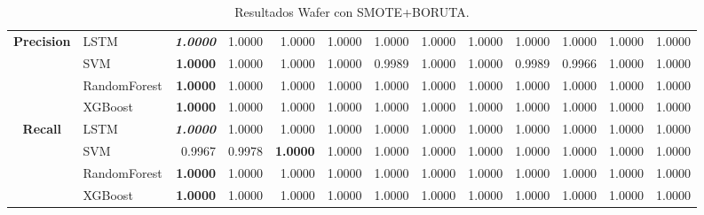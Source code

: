 \begin{table}[H]
\begin{adjustbox}{max width=12cm}
\begin{tabular}{|c|l|r|r|r|r|r|r|r|r|r|r|r|}
			\hline
			\textbf{Precision} &  LSTM & \textit{ \textbf{  1.0000 } } &  1.0000 &  1.0000 &  1.0000 &  1.0000 &  1.0000 &  1.0000 &  1.0000 &  1.0000 &  1.0000 &  1.0000 \\
			&  SVM & \textbf{  1.0000 } &  1.0000 &  1.0000 &  1.0000 &  0.9989 &  1.0000 &  1.0000 &  0.9989 &  0.9966 &  1.0000 &  1.0000 \\
			&  RandomForest & \textbf{  1.0000 } &  1.0000 &  1.0000 &  1.0000 &  1.0000 &  1.0000 &  1.0000 &  1.0000 &  1.0000 &  1.0000 &  1.0000 \\
			&  XGBoost & \textbf{  1.0000 } &  1.0000 &  1.0000 &  1.0000 &  1.0000 &  1.0000 &  1.0000 &  1.0000 &  1.0000 &  1.0000 &  1.0000 \\
			\hline
			\textbf{Recall} &  LSTM & \textit{ \textbf{  1.0000 } } &  1.0000 &  1.0000 &  1.0000 &  1.0000 &  1.0000 &  1.0000 &  1.0000 &  1.0000 &  1.0000 &  1.0000 \\
			&  SVM &  0.9967 &  0.9978 & \textbf{  1.0000 } &  1.0000 &  1.0000 &  1.0000 &  1.0000 &  1.0000 &  1.0000 &  1.0000 &  1.0000 \\
			&  RandomForest & \textbf{  1.0000 } &  1.0000 &  1.0000 &  1.0000 &  1.0000 &  1.0000 &  1.0000 &  1.0000 &  1.0000 &  1.0000 &  1.0000 \\
			&  XGBoost & \textbf{  1.0000 } &  1.0000 &  1.0000 &  1.0000 &  1.0000 &  1.0000 &  1.0000 &  1.0000 &  1.0000 &  1.0000 &  1.0000 \\
			\hline
		\end{tabular}
	\end{adjustbox}
	\caption{Resultados Wafer con SMOTE+BORUTA.}
	\label{tab:Wafer_SMOTE_BORUTA}
\end{table}

